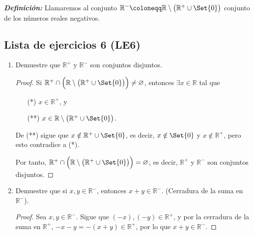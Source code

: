 \documentclass[11pt]{article}
\newcommand{\R}{\mathbb{R}}
\newcommand{\defined}{\coloneqq}
\newcommand{\bfit}[1]{\textbf{\textit{#1}}}
\let\emptyset\varnothing
\let\set\Set
\let\union\cup
\let\intersection\cap
\begin{document}
\bfit{Definición:} Llamaremos al conjunto $\R^-\defined \R\setminus\bigl(\R^+\union \set{0}\bigr)$ conjunto de los números reales negativos.

\subsection*{Lista de ejercicios 6 (LE6)}

\begin{enumerate}[label=\alph*)]
    \item Demuestre que $\R^+$ y $\R^-$ son conjuntos disjuntos.
    \vspace{-1em}
    \begin{proof}%
    Si $\R^+ \intersection \Bigl(\R\setminus\bigl(\R^+\union \set{0}\bigr)\Bigr) \neq \emptyset$, entonces $\exists x\in \R$ tal que \begin{itemize}%
    \item[(*)] $x\in \R^+$, y 
    \item[(**)] $x\in \R\setminus\bigl(\R^+\union \set{0}\bigr)$.
    \end{itemize}  De (**) sigue que $x\notin \R^+\union \set{0}$, es decir, $x\notin \set{0}$ y $x\notin \R^+$, pero esto contradice a (*).

    Por tanto, $\R^+ \intersection \Bigl(\R\setminus\bigl(\R^+\union \set{0}\bigr)\Bigr) = \emptyset$, es decir, $\R^+$ y $\R^-$ son conjuntos disjuntos.
    \end{proof} \vspace{-1em}

    \item Demuestre que si $x,y \in \R^-$, entonces $x+y\in \R^-$. (Cerradura de la suma en $\R^-$).
    \vspace{-1em}
    \begin{proof}
    Sea $x,y\in \R^-$. Sigue que $(-x), (-y)\in \R^+$, y por la cerradura de la suma en $\R^+$, $-x-y=-(x+y)\in \R^+$, por lo que $x+y\in \R^-$.
    \end{proof} \vspace{-1em}


\end{enumerate}
\end{document}
